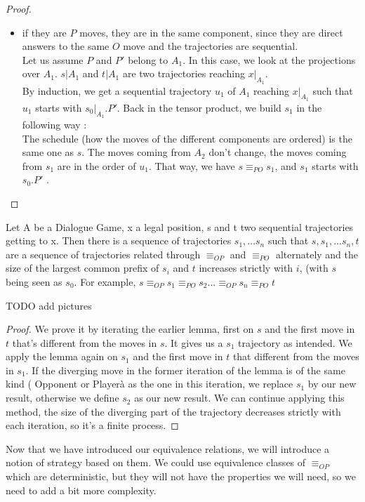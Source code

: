 \documentclass[a4paper,UKenglish]{lipics}
\begin{document}
\begin{proof}
\begin{itemize}
\begin{itemize}
\end{itemize}
\item if they are $P$ moves,  they are in the same component, since they are direct answers to the same $O$ move and the trajectories are sequential.\\ Let us assume $P$ and $P'$ belong to $A_1$. In this case, we look at the projections over $A_1$. $s|A_1$ and $t|A_1$ are two trajectories reaching $x|_{A_1}$.\\
 By induction, we get a sequential trajectory $u_1$ of $A_1$ reaching $x|_{A_1}$ such that $u_1$ starts with $s_0|_{A_1}.P'$. Back in the tensor product, we build $s_1$ in the following way :\\
 The schedule (how the moves of the different components are ordered) is the same one as $s$. The moves coming from $A_2$ don't change, the moves coming from $s_1$ are in the order of $u_1$. That way, we have $s \equiv_{PO} s_1$, and $s_1$ starts with $s_0.P'$ . \\


\end{itemize}
\end{proof}

\begin{lemma}
Let A be a Dialogue Game, x a legal position, s and t two sequential trajectories getting to x. Then there is a sequence of trajectories $s_1,...s_n$ such that $s,s_1,... s_n,t$ are a sequence of trajectories related through $\equiv_{OP}$ and $\equiv_{PO}$ alternately and the size of the largest common prefix of $s_i$ and $t$ increases strictly with $i$, (with $s$ being seen as $s_0$. For example,  $s \equiv_{OP} s_1\equiv_{PO} s_2 ... \equiv_{OP} s_n \equiv_{PO} t$
\end{lemma} 
TODO add pictures
\begin{proof}
We prove it by iterating the earlier lemma, first on $s$ and the first move in $t$ that's different from the moves in $s$. It gives us a $s_1$ trajectory as intended. We apply the lemma again on $s_1$ and the first move in $t$ that different from the moves in $s_1$. If the diverging move in the former iteration of the lemma is of the same kind ( Opponent or Playerà as the one in this iteration, we replace $s_1$ by our new result, otherwise we define $s_2$ as our new result. We can continue applying this method, the size of the diverging part of the trajectory decreases strictly with each iteration, so it's a finite process.
\end{proof}

Now that we have introduced our equivalence relations, we will introduce a notion of strategy based on them. We could use equivalence classes of $\equiv_{OP}$  which are deterministic, but they will not have the properties we will need, so we need to add a bit more complexity.
\end{document}
